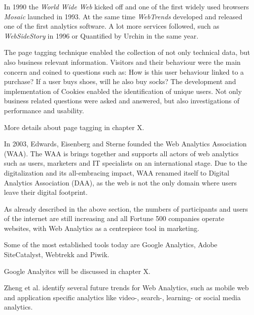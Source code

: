 
In 1990 the \textit{World Wide Web} kicked off and one of the first widely used browsers \textit{Mosaic} launched in 1993.
At the same time \textit{WebTrends} developed and released one of the first analytics software.
A lot more services followed, such as \textit{WebSideStory} in 1996 %
or Quantified by Urchin in the same year.%

The page tagging technique enabled the collection of not only technical data, but also business relevant information.
Visitors and their behaviour were the main concern and coined to questions such as: How is this user behaviour linked to a purchase? If a user buys shoes, will he also buy socks?
The development and implementation of Cookies enabled the identification of unique users.
Not only business related questions were asked and answered, but also investigations of performance and usability.

More details about page tagging in chapter X.


In 2003, Edwards, Eisenberg and Sterne founded the Web Analytics Association (WAA).
The WAA is brings together and supports all actors of web analytics such as users, marketers and IT specialists on an international stage.
Due to the digitalization and its all-embracing impact, WAA renamed itself to Digital Analytics Association (DAA), as the web is not the only domain where users leave their digital footprint.

As already described in the above section, the numbers of participants and users of the internet are still increasing and all Fortune 500 companies operate websites, with Web Analytics as a centrepiece tool in marketing. %

Some of the most established tools today are Google Analytics, Adobe SiteCatalyst, Webtrekk and Piwik. %

Google Analyitcs will be discussed in chapter X.

Zheng et al. identify several future trends for Web Analytics, such as mobile web and application specific analytics like video-, search-, learning- or social media analytics. %



